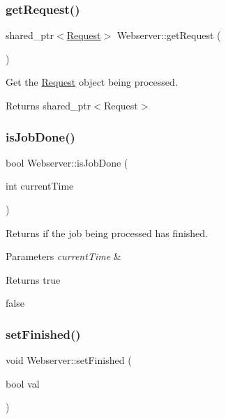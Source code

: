 \subsubsection{\texorpdfstring{get\+Request()}{getRequest()}}
{\footnotesize\ttfamily shared\+\_\+ptr$<$\hyperlink{classRequest}{Request}$>$ Webserver\+::get\+Request (\begin{DoxyParamCaption}{ }\end{DoxyParamCaption})\hspace{0.3cm}{\ttfamily [inline]}}



Get the \hyperlink{classRequest}{Request} object being processed. 

\begin{DoxyReturn}{Returns}
shared\+\_\+ptr$<$\+Request$>$ 
\end{DoxyReturn}
\mbox{\label{classWebserver_a25d0b2f418c84058bb49408aacee9745}} 
\subsubsection{\texorpdfstring{is\+Job\+Done()}{isJobDone()}}
{\footnotesize\ttfamily bool Webserver\+::is\+Job\+Done (\begin{DoxyParamCaption}\item[{int}]{current\+Time }\end{DoxyParamCaption})\hspace{0.3cm}{\ttfamily [inline]}}



Returns if the job being processed has finished. 


\begin{DoxyParams}{Parameters}
{\em current\+Time} & \\
\hline
\end{DoxyParams}
\begin{DoxyReturn}{Returns}
true 

false 
\end{DoxyReturn}
\mbox{\label{classWebserver_a385a32307e09550c301660581bada2e5}} 
\subsubsection{\texorpdfstring{set\+Finished()}{setFinished()}}
{\footnotesize\ttfamily void Webserver\+::set\+Finished (\begin{DoxyParamCaption}\item[{bool}]{val }\end{DoxyParamCaption})\hspace{0.3cm}{\ttfamily [inline]}}



